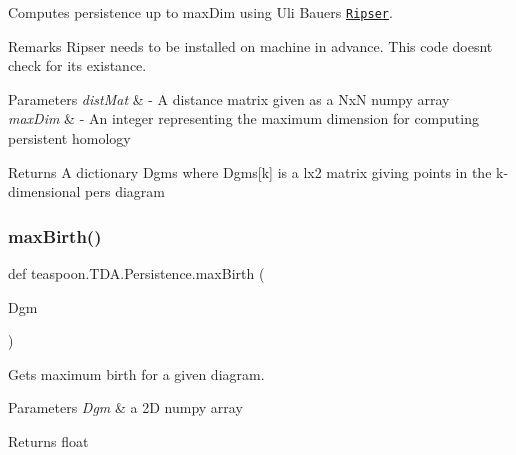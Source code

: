 Computes persistence up to max\+Dim using Uli Bauer\textquotesingle{}s \href{https://github.com/Ripser/ripser}{\tt Ripser}. 

\begin{DoxyRemark}{Remarks}
Ripser needs to be installed on machine in advance. This code doesn\textquotesingle{}t check for it\textquotesingle{}s existance.
\end{DoxyRemark}

\begin{DoxyParams}{Parameters}
{\em dist\+Mat} & -\/ A distance matrix given as a NxN numpy array \\
\hline
{\em max\+Dim} & -\/ An integer representing the maximum dimension for computing persistent homology\\
\hline
\end{DoxyParams}
\begin{DoxyReturn}{Returns}
A dictionary Dgms where Dgms\mbox{[}k\mbox{]} is a lx2 matrix giving points in the k-\/dimensional pers diagram 
\end{DoxyReturn}
\mbox{\label{namespaceteaspoon_1_1_t_d_a_1_1_persistence_aa91a12cbd748fc2f13944fbc653739d1}} 
\subsubsection{\texorpdfstring{max\+Birth()}{maxBirth()}}
{\footnotesize\ttfamily def teaspoon.\+T\+D\+A.\+Persistence.\+max\+Birth (\begin{DoxyParamCaption}\item[{}]{Dgm }\end{DoxyParamCaption})}



Gets maximum birth for a given diagram. 


\begin{DoxyParams}{Parameters}
{\em Dgm} & a 2D numpy array\\
\hline
\end{DoxyParams}
\begin{DoxyReturn}{Returns}
float 
\end{DoxyReturn}
\mbox{\label{namespaceteaspoon_1_1_t_d_a_1_1_persistence_a866a47a538d7042da1de685bed83d00e}} 
